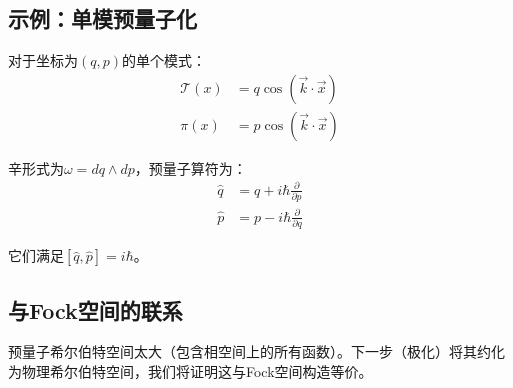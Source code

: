 \subsection{示例：单模预量子化}

对于坐标为$(q, p)$的单个模式：
\begin{align}
    \mathcal{T}(x) &= q \cos(\vec{k} \cdot \vec{x}) \\
    \pi(x) &= p \cos(\vec{k} \cdot \vec{x})
\end{align}

辛形式为$\omega = dq \wedge dp$，预量子算符为：
\begin{align}
    \hat{q} &= q + i\hbar \frac{\partial}{\partial p} \\
    \hat{p} &= p - i\hbar \frac{\partial}{\partial q}
\end{align}

它们满足$[\hat{q}, \hat{p}] = i\hbar$。

\subsection{与Fock空间的联系}

预量子希尔伯特空间太大（包含相空间上的所有函数）。下一步（极化）将其约化为物理希尔伯特空间，我们将证明这与Fock空间构造等价。

